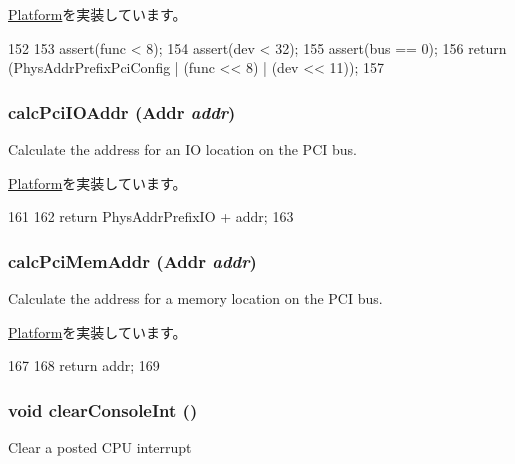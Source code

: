 \hyperlink{classPlatform_a4a2bdce1a8794dd3ea6ca12b36320433}{Platform}を実装しています。


\begin{DoxyCode}
152 {
153     assert(func < 8);
154     assert(dev < 32);
155     assert(bus == 0);
156     return (PhysAddrPrefixPciConfig | (func << 8) | (dev << 11));
157 }
\end{DoxyCode}
\hypertarget{classPc_a83afd16479598cfaeb035fd30eeedd8b}{
\subsubsection[{calcPciIOAddr}]{ calcPciIOAddr ({\bf Addr} {\em addr})}}
\label{classPc_a83afd16479598cfaeb035fd30eeedd8b}
Calculate the address for an IO location on the PCI bus. 

\hyperlink{classPlatform_a3d1d55996e865ab1b65c732496c08b00}{Platform}を実装しています。


\begin{DoxyCode}
161 {
162     return PhysAddrPrefixIO + addr;
163 }
\end{DoxyCode}
\hypertarget{classPc_aa2acd9bf04ba56b380e7812ce29971b5}{
\subsubsection[{calcPciMemAddr}]{ calcPciMemAddr ({\bf Addr} {\em addr})}}
\label{classPc_aa2acd9bf04ba56b380e7812ce29971b5}
Calculate the address for a memory location on the PCI bus. 

\hyperlink{classPlatform_a303d8161e77b31b8425cb320562a54b2}{Platform}を実装しています。


\begin{DoxyCode}
167 {
168     return addr;
169 }
\end{DoxyCode}
\hypertarget{classPc_ad38e46034c079c8e765d3ac7eb99337d}{
\subsubsection[{clearConsoleInt}]{\setlength{\rightskip}{0pt plus 5cm}void clearConsoleInt ()}}
\label{classPc_ad38e46034c079c8e765d3ac7eb99337d}
Clear a posted CPU interrupt 

